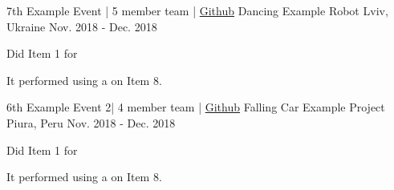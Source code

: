

\begin{cventries}

  \cventry
    {7th Example Event | 5 member team | \href{https://github.com/blah/blah}{\faGithubSquare\acvHeaderIconSep Github}} %
    {Dancing Example Robot} %
    {Lviv, Ukraine} %
    {Nov. 2018 - Dec. 2018} %
    {
      \begin{cvitems} %
        \item {Did Item 1 for }
        \item {It performed  using a  on Item 8.}
      \end{cvitems}
    }
    
     \cventry
    {6th Example Event 2| 4 member team | \href{https://github.com/blah/blah}{\faGithubSquare\acvHeaderIconSep Github}} %
    {Falling Car Example Project} %
    {Piura, Peru} %
    {Nov. 2018 - Dec. 2018} %
    {
      \begin{cvitems} %
        \item {Did Item 1 for }
        \item {It performed  using a  on Item 8.}
      \end{cvitems}
    }


\end{cventries}
